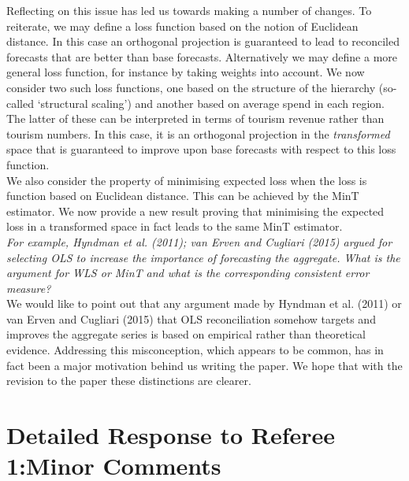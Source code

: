 \documentclass[a4paper,11pt]{article}
\begin{document}
\begin{enumerate}
	    
	    Reflecting on this issue has led us towards making a number of changes.  To reiterate, we may define a loss function based on the notion of Euclidean distance.  In this case an orthogonal projection is guaranteed to lead to reconciled forecasts that are better than base forecasts.  Alternatively we may define a more general loss function, for instance by taking weights into account.  We now consider two such loss functions, one based on the structure of the hierarchy (so-called `structural scaling') and another based on average spend in each region.  The latter of these can be interpreted in terms of tourism revenue rather than tourism numbers.  In this case, it is an orthogonal projection in the \textit{transformed} space that is guaranteed to improve upon base forecasts with respect to this loss function.\\
	    
	    We also consider the property of minimising expected loss when the loss is function based on Euclidean distance.  This can be achieved by the MinT estimator.  We now provide a new result proving that minimising the expected loss in a transformed space in fact leads to the same MinT estimator.\\
		
		\textit{For example, Hyndman et al. (2011); van Erven and
		Cugliari (2015) argued for selecting OLS to increase the importance of
		forecasting the aggregate. What is the argument for WLS or MinT and
		what is the corresponding consistent error measure?}\\
	    
	    We would like to point out that any argument made by Hyndman et al. (2011) or van Erven and Cugliari (2015) that OLS reconciliation somehow targets and improves the aggregate series is based on empirical rather than theoretical evidence.  Addressing this misconception, which appears to be common, has in fact been a major motivation behind us writing the paper.  We hope that with the revision to the paper these distinctions are clearer.\\
	    
	    \end{enumerate}
	    
	    \section*{Detailed Response to Referee 1:Minor Comments}
	    
\end{document}
